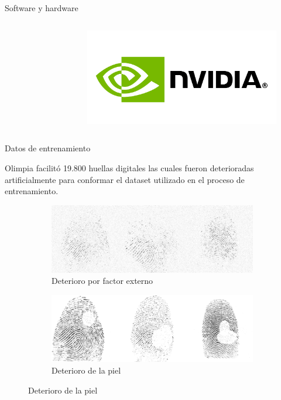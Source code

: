 \documentclass[12pt,aspectratio=169]{beamer}
\begin{document}
\begin{frame}{Software y hardware}
\begin{columns}[c]
\begin{figure}
            \end{figure}
            \vspace*{-7mm}
            \begin{figure}
                \includegraphics[scale=0.06]{figs/nvidia.png}
            \end{figure}
    \end{columns}

\end{frame}

\begin{frame}{Datos de entrenamiento}

    Olimpia facilitó 19.800 huellas digitales las cuales fueron deterioradas artificialmente para conformar el dataset utilizado en el proceso de entrenamiento.
    \vspace{5mm}

    \begin{figure}
        \begin{subfigure}{0.48\textwidth}
            \centering
            \includegraphics[scale=0.24]{figs/deterioration_2.png}
            \caption{Deterioro por factor externo}
        \end{subfigure}
        \begin{subfigure}{0.48\textwidth}
            \centering
            \includegraphics[scale=0.24]{figs/deterioration_1.png}
            \caption{Deterioro de la piel}
        \end{subfigure}
    \end{figure}

\end{frame}
\end{document}
